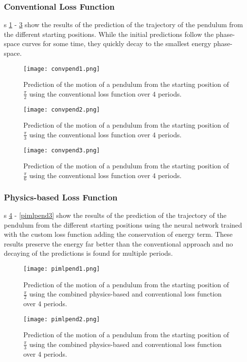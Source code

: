 \documentclass[3p]{elsarticle}
\begin{document}
\subsubsection{Conventional Loss Function}
\figurename s \ref{convpend1} - \ref{convpend3} show the results of the prediction of the trajectory of the pendulum from the different starting positions. While the initial predictions follow the phase-space curves for some time, they quickly decay to the smallest energy phase-space.
\begin{figure}
	\centering
	\texttt{[image: convpend1.png]}
	\caption{Prediction of the motion of a pendulum from the starting position of $\frac{\pi}{2}$ using the conventional loss function over 4 periods.}
	\label{convpend1}
\end{figure}
\begin{figure}
	\centering
\texttt{[image: convpend2.png]}
\caption{Prediction of the motion of a pendulum from the starting position of $\frac{\pi}{3}$ using the conventional loss function over 4 periods.}
\label{convpend2}
\end{figure}
\begin{figure}
	\centering
\texttt{[image: convpend3.png]}
\caption{Prediction of the motion of a pendulum from the starting position of $\frac{\pi}{6}$ using the conventional loss function over 4 periods.}
\label{convpend3}
\end{figure}
\subsubsection{Physics-based Loss Function}
\figurename s \ref{pimlpend1} - \ref{pimlpend3} show the results of the prediction of the trajectory of the pendulum from the different starting positions using the neural network trained with the custom loss function adding the conservation of energy term. These results preserve the energy far better than the conventional approach and no decaying of the predictions is found for multiple periods.
\begin{figure}
	\centering
\texttt{[image: pimlpend1.png]}
\caption{Prediction of the motion of a pendulum from the starting position of $\frac{\pi}{2}$ using the combined physics-based and conventional loss function over 4 periods.}
\label{pimlpend1}
\end{figure}

\begin{figure}
	\centering
	\texttt{[image: pimlpend2.png]}
	\caption{Prediction of the motion of a pendulum from the starting position of $\frac{\pi}{3}$ using the combined physics-based and conventional loss function over 4 periods.}
	\label{pimlpend2}
\end{figure}
\end{document}
